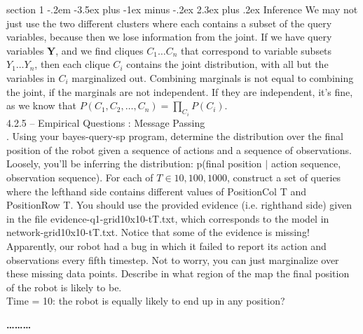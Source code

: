 \documentclass[12pt]{article}
\makeatletter
\newenvironment{problem}{\@startsection
       {section}
       {1}
       {-.2em}
       {-3.5ex plus -1ex minus -.2ex}
       {2.3ex plus .2ex}
       {\pagebreak[3]%
       \large\bf\noindent{Problem }
       }
       }
       {%
       \begin{center}\large\bf \ldots\ldots\ldots\end{center}}
\makeatother
\begin{document}
\begin{problem}{Inference}
We may not just use the two different clusters where each contains a subset of the query variables, because then we lose information from the joint.  If we have query variables $\textbf{Y}$, and we find cliques $C_1 \ldots C_n$ that correspond to variable subsets $Y_1 \ldots Y_n$, then each clique $C_i$ contains the joint distribution, with all but the variables in $C_i$ marginalized out.  Combining marginals is not equal to combining the joint, if the marginals are not independent.  If they are independent, it's fine, as we know that $P(C_1,C_2,\ldots,C_n) = \prod_{C_i} P(C_i)$.\\

4.2.5 -- Empirical Questions : Message Passing\\

. Using your bayes-query-sp program, determine the distribution over the final position of the robot given a sequence of actions and a sequence of observations. Loosely, you'll be inferring the distribution: p(final position $\mid$ action sequence, observation sequence). For each of $T \in {10,100,1000}$, construct a set of queries where the lefthand side contains different values of PositionCol T and PositionRow T. You should use the provided evidence (i.e. righthand side) given in the file evidence-q1-grid10x10-tT.txt, which corresponds to the model in network-grid10x10-tT.txt. Notice that some of the evidence is missing! Apparently, our robot had a bug in which it failed to report its action and observations every fifth timestep. Not to worry, you can just marginalize over these missing data points. Describe in what region of the map the final position of the robot is likely to be.\\
Time = 10: the robot is equally likely to end up in any position?\\

\end{problem}{}
\end{document}
